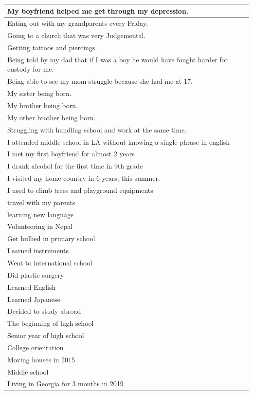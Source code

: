 \documentclass[
  .7em,
  letterpaper,
  DIV=11,
  numbers=noendperiod]{scrartcl}
\begin{document}
\begin{table}
\begin{tabular}{l}
\hline
My boyfriend helped me get through my depression.\\
\hline
Eating out with my grandparents every Friday.\\
\hline
Going to a church that was very Judgemental.\\
\hline
Getting tattoos and piercings.\\
\hline
Being told by my dad that if I was a boy he would have fought harder for custody for me.\\
\hline
Being able to see my mom struggle because she had me at 17.\\
\hline
My sister being born.\\
\hline
My brother being born.\\
\hline
My other brother being born.\\
\hline
Struggling with handling school and work at the same time.\\
\hline
I attended middle school in LA without knowing a single phrase in english\\
\hline
I met my first boyfriend for almost 2 years\\
\hline
I drank alcohol for the first time in 9th grade\\
\hline
I visited my home country in 6 years, this summer.\\
\hline
I used to climb trees and playground equipments\\
\hline
travel with my parents\\
\hline
learning new language\\
\hline
Volunteering in Nepal\\
\hline
Get bullied in primary school\\
\hline
Learned instruments\\
\hline
Went to international school\\
\hline
Did plastic surgery\\
\hline
Learned English\\
\hline
Learned Japanese\\
\hline
Decided to study abroad\\
\hline
The beginning of high school\\
\hline
Senior year of high school\\
\hline
College orientation\\
\hline
Moving houses in 2015\\
\hline
Middle school\\
\hline
Living in Georgia for 3 months in 2019\\

\end{tabular}
\end{table}
\end{document}
